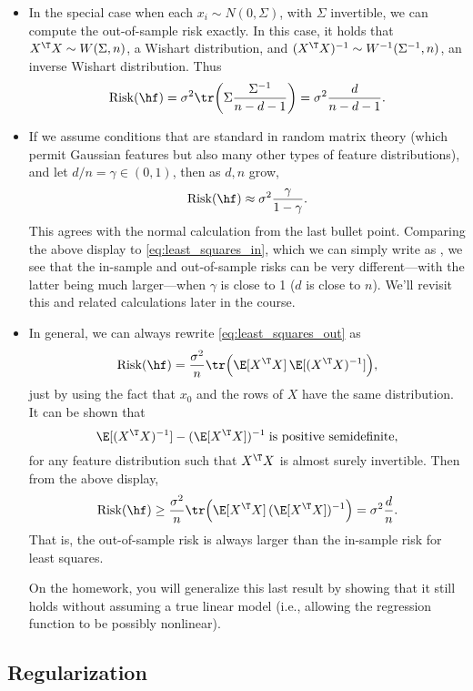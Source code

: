 \documentclass{article}
\begin{document}
\begin{itemize}
\item In the special case when each $x_i \sim N(0,\Sigma)$, with $\Sigma$
  invertible, we can compute the out-of-sample risk exactly. In this case, it
  holds that $X^\T X \sim W(\Sigma, n)$, a Wishart distribution, and $(X^\T
  X)^{-1} \sim W^{-1}(\Sigma^{-1}, n)$, an inverse Wishart distribution. Thus   
  \[
  \Risk(\hf) = \sigma^2 \tr\bigg(\Sigma \frac{\Sigma^{-1}}{n-d-1}\bigg)
  = \sigma^2 \frac{d}{n-d-1}.
  \]

\item If we assume conditions that are standard in random matrix theory (which
  permit Gaussian features but also many other types of feature distributions),
  and let $d/n = \gamma \in (0,1)$, then as $d,n$ grow, 
  \[
  \Risk(\hf) \approx \sigma^2 \frac{\gamma}{1-\gamma}.
  \]
  This agrees with the normal calculation from the last bullet point. Comparing
  the above display to \eqref{eq:least_squares_in}, which we can simply write as 
  , we see that the in-sample and
  out-of-sample risks can be very different---with the latter being much
  larger---when $\gamma$ is close to 1 ($d$ is close to $n$). We'll revisit this 
  and related calculations later in the course.      

\item In general, we can always rewrite \eqref{eq:least_squares_out} as  
  \[
  \Risk(\hf) = \frac{\sigma^2}{n} \tr\Big(\E [X^\T X] \, \E [(X^\T X)^{-1}]
  \Big),  
  \]
  just by using the fact that $x_0$ and the rows of $X$ have the same
  distribution. It can be shown \citep{groves1969note} that 
  \[
  \E[(X^\T X)^{-1}] - (\E[X^\T X])^{-1} \; \text{is positive semidefinite},
  \]
  for any feature distribution such that $X^\T X$ is almost surely
  invertible. Then from the above display,
  \[
  \Risk(\hf) \geq \frac{\sigma^2}{n} \tr\Big(\E [X^\T X] \, (\E[X^\T X])^{-1}
  \Big) = \sigma^2 \frac{d}{n}.
  \]
  That is, the out-of-sample risk is always larger than the in-sample risk for
  least squares.

  On the homework, you will generalize this last result by showing that it still 
  holds without assuming a true linear model (i.e., allowing the regression
  function to be possibly nonlinear). 
\end{itemize}

\subsection{Regularization}
\end{document}
